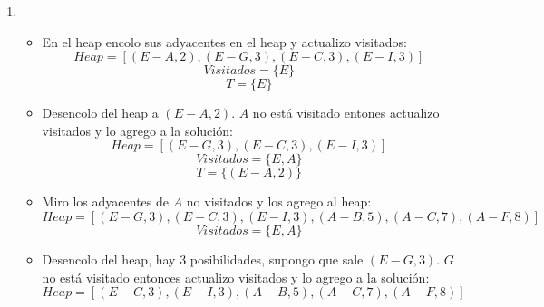 \documentclass{article}
\begin{document}
\begin{enumerate}[label=\alph*)]
    \item
        \begin{itemize}
            Comenzando por el vértice $E$ del grafo.
            \item En el heap encolo sus adyacentes en el heap y actualizo visitados:
                \begin{equation*}
                    Heap = [(E-A, 2), (E-G, 3), (E-C, 3), (E-I, 3)]
                \end{equation*}
                \begin{equation*}
                    Visitados = \{E\}
                \end{equation*}
                \begin{equation*}
                    T = \{E\}
                \end{equation*}
            \item Desencolo del heap a $(E-A, 2)$. $A$ no está visitado entones actualizo visitados y lo agrego a la solución:
                \begin{equation*}
                    Heap = [(E-G, 3), (E-C, 3), (E-I, 3)]
                \end{equation*}
                \begin{equation*}
                    Visitados = \{E, A\}
                \end{equation*}
                \begin{equation*}
                    T = \{(E-A, 2)\}
                \end{equation*}
            \item Miro los adyacentes de $A$ no visitados y los agrego al heap:
                \begin{equation*}
                    Heap = [(E-G, 3), (E-C, 3), (E-I, 3), (A-B, 5), (A-C, 7), (A-F, 8)]
                \end{equation*}
                \begin{equation*}
                    Visitados = \{E, A\}
                \end{equation*}
            \item Desencolo del heap, hay 3 posibilidades, supongo que sale $(E-G, 3)$. $G$ no está visitado entonces actualizo visitados y lo agrego a la solución:
                \begin{equation*}
                    Heap = [(E-C, 3), (E-I, 3), (A-B, 5), (A-C, 7), (A-F, 8)]
                \end{equation*}

\end{itemize}
\end{enumerate}
\end{document}
